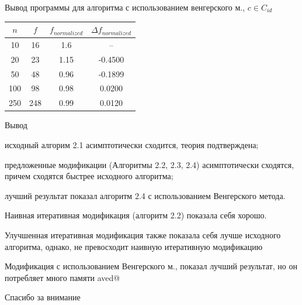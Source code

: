 \documentclass[12pt]{beamer}
\makeatletter
\newenvironment{cenumerate}{%
  \enumerate
  \setcounter{\@enumctr}{\csname saved@\@enumctr\endcsname}%
}{%
  \expandafter\xdef\csname saved@\@enumctr\endcsname{\the\value{\@enumctr}}%
  \endenumerate
}
\newenvironment{cenumerate*}{%
  \enumerate
}{%
  \expandafter\xdef\csname saved@\@enumctr\endcsname{\the\value{\@enumctr}}%
  \endenumerate
}
\makeatother
\begin{document}
\begin{frame}{Вывод программы для алгоритма с использованием венгерского м., $c \in C_{id}$}
\begin{tabular}{|c|c|c|c|}
\hline $n$ & $f$ & $f_{normalized}$ & $\Delta f_{normalized}$ \\
\hline 10   & 16      & 1.6  & -- \\ 
\hline 20   & 23  & 1.15 & -0.4500 \\ 
\hline 50   & 48  & 0.96 & -0.1899 \\ 
\hline 100  & 98   & 0.98 & 0.0200 \\ 
\hline 250  & 248  & 0.99 & 0.0120 \\ 
\hline
\end{tabular}
\end{frame}



\begin{frame}{Вывод}
\begin{cenumerate*}
\item исходный алгорим 2.1 асимптотически сходится, теория подтверждена;
\item предложенные модификации (Алгоритмы 2.2, 2.3, 2.4) асимптотически сходятся, причем сходятся быстрее исходного алгоритма;
\item лучший результат показал алгоритм 2.4 с использованием Венгерского метода. 
\end{cenumerate*}
\end{frame}

\begin{frame}
\begin{cenumerate}
\item Наивная итеративная модификация (алгоритм 2.2) показала себя хорошо.
\item Улучшенная итеративная модификация также показала себя лучше исходного алгоритма, однако, не превосходит
наивную итеративную модификацию
\item Модификация с использованием Венгерского м., показал лучший результат, но он потребляет много памяти
\end{cenumerate}
\end{frame}

\begin{frame}
Спасибо за внимание
\end{frame}
\end{document}
